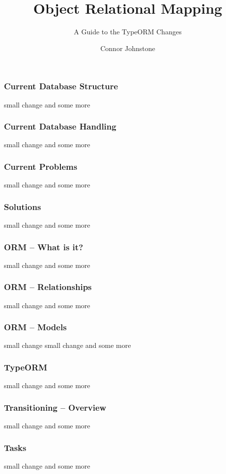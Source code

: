 \documentclass{beamer}
\title[]{Object Relational Mapping}
\subtitle[]{A Guide to the TypeORM Changes}
\author[]{Connor Johnstone}
\institute[]{Palski and Associates}
\date{}
\begin{document}
  \begin{frame}
  \titlepage
  \end{frame}

  \begin{frame}[fragile]
  \frametitle{Current Database Structure}
  small change
  and some more
  \end{frame}

  \begin{frame}[fragile]
  \frametitle{Current Database Handling}
  small change
  and some more
  \end{frame}

  \begin{frame}[fragile]
  \frametitle{Current Problems}
  small change
  and some more
  \end{frame}

  \begin{frame}[fragile]
  \frametitle{Solutions}
  small change
  and some more
  \end{frame}

  \begin{frame}[fragile]
  \frametitle{ORM -- What is it?}
  small change
  and some more
  \end{frame}

  \begin{frame}[fragile]
  \frametitle{ORM -- Relationships}
  small change
  and some more
  \end{frame}

  \begin{frame}[fragile]
  \frametitle{ORM -- Models}
  small change
  small change
  and some more
  \end{frame}

  \begin{frame}[fragile]
  \frametitle{TypeORM}
  small change
  and some more
  \end{frame}

  \begin{frame}[fragile]
  \frametitle{Transitioning -- Overview}
  small change
  and some more
  \end{frame}

  \begin{frame}[fragile]
  \frametitle{Tasks}
  small change
  and some more
  \end{frame}
\end{document}
